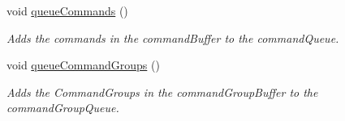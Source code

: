 \begin{DoxyCompactItemize}
\mbox{\label{classlib_iterative_robot_1_1_event_scheduler_a0334c1b83511053b6da8583caf6b87be}} 
void \mbox{\hyperlink{classlib_iterative_robot_1_1_event_scheduler_a0334c1b83511053b6da8583caf6b87be}{queue\+Commands}} ()
\begin{DoxyCompactList}\small\item\em Adds the commands in the command\+Buffer to the command\+Queue. \end{DoxyCompactList}\item 
\mbox{\label{classlib_iterative_robot_1_1_event_scheduler_a4df12d213a4ea996c942fdf1b85033b1}} 
void \mbox{\hyperlink{classlib_iterative_robot_1_1_event_scheduler_a4df12d213a4ea996c942fdf1b85033b1}{queue\+Command\+Groups}} ()
\begin{DoxyCompactList}\small\item\em Adds the Command\+Groups in the command\+Group\+Buffer to the command\+Group\+Queue. \end{DoxyCompactList}\end{DoxyCompactItemize}
